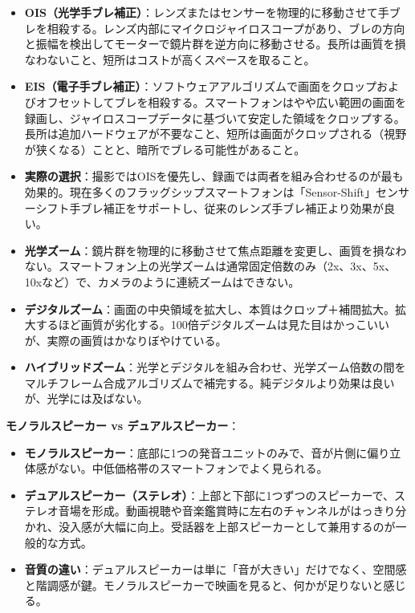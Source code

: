 \begin{itemize}
  \item \textbf{OIS（光学手ブレ補正）}：レンズまたはセンサーを物理的に移動させて手ブレを相殺する。レンズ内部にマイクロジャイロスコープがあり、ブレの方向と振幅を検出してモーターで鏡片群を逆方向に移動させる。長所は画質を損なわないこと、短所はコストが高くスペースを取ること。
  \item \textbf{EIS（電子手ブレ補正）}：ソフトウェアアルゴリズムで画面をクロップおよびオフセットしてブレを相殺する。スマートフォンはやや広い範囲の画面を録画し、ジャイロスコープデータに基づいて安定した領域をクロップする。長所は追加ハードウェアが不要なこと、短所は画面がクロップされる（視野が狭くなる）ことと、暗所でブレる可能性があること。
  \item \textbf{実際の選択}：撮影ではOISを優先し、録画では両者を組み合わせるのが最も効果的。現在多くのフラッグシップスマートフォンは「Sensor-Shift」センサーシフト手ブレ補正をサポートし、従来のレンズ手ブレ補正より効果が良い。
\end{itemize}


\begin{itemize}
  \item \textbf{光学ズーム}：鏡片群を物理的に移動させて焦点距離を変更し、画質を損なわない。スマートフォン上の光学ズームは通常固定倍数のみ（2x、3x、5x、10xなど）で、カメラのように連続ズームはできない。
  \item \textbf{デジタルズーム}：画面の中央領域を拡大し、本質はクロップ＋補間拡大。拡大するほど画質が劣化する。100倍デジタルズームは見た目はかっこいいが、実際の画質はかなりぼやけている。
  \item \textbf{ハイブリッドズーム}：光学とデジタルを組み合わせ、光学ズーム倍数の間をマルチフレーム合成アルゴリズムで補完する。純デジタルより効果は良いが、光学には及ばない。
\end{itemize}


\textbf{モノラルスピーカー vs デュアルスピーカー}：

\begin{itemize}
  \item \textbf{モノラルスピーカー}：底部に1つの発音ユニットのみで、音が片側に偏り立体感がない。中低価格帯のスマートフォンでよく見られる。
  \item \textbf{デュアルスピーカー（ステレオ）}：上部と下部に1つずつのスピーカーで、ステレオ音場を形成。動画視聴や音楽鑑賞時に左右のチャンネルがはっきり分かれ、没入感が大幅に向上。受話器を上部スピーカーとして兼用するのが一般的な方式。
  \item \textbf{音質の違い}：デュアルスピーカーは単に「音が大きい」だけでなく、空間感と階調感が鍵。モノラルスピーカーで映画を見ると、何かが足りないと感じる。
\end{itemize}

